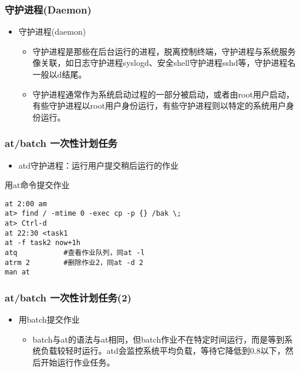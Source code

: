 \documentclass[xcolor=svgnames,presentation]{beamer}
\begin{document}
\begin{frame}
\frametitle{守护进程(Daemon)}
\label{sec-3-1-8}
\begin{itemize}

\item 守护进程(daemon)
\label{sec-3-1-8-1}%
\begin{itemize}

\item 守护进程是那些在后台运行的进程，脱离控制终端，守护进程与系统服务像关联，如日志守护进程syslogd、安全shell守护进程sshd等，守护进程名一般以d结尾。
\label{sec-3-1-8-1-1}%

\item 守护进程通常作为系统启动过程的一部分被启动，或者由root用户启动，有些守护进程以root用户身份运行，有些守护进程则以特定的系统用户身份运行。
\label{sec-3-1-8-1-2}%
\end{itemize} %
\end{itemize} %
\end{frame}
\begin{frame}[fragile]
\frametitle{at/batch 一次性计划任务}
\label{sec-3-1-9}
\begin{itemize}

\item atd守护进程：运行用户提交稍后运行的作业
\label{sec-3-1-9-1}%
\end{itemize} %
\begin{exampleblock}{用at命令提交作业}
\label{sec-3-1-9-2}


\begin{verbatim}
at 2:00 am
at> find / -mtime 0 -exec cp -p {} /bak \;
at> Ctrl-d
at 22:30 <task1
at -f task2 now+1h
atq           #查看作业队列，同at -l
atrm 2        #删除作业2，同at -d 2
man at
\end{verbatim}
\end{exampleblock}
\end{frame}
\begin{frame}
\frametitle{at/batch 一次性计划任务(2)}
\label{sec-3-1-10}
\begin{itemize}

\item 用batch提交作业
\label{sec-3-1-10-1}%
\begin{itemize}

\item batch与at的语法与at相同，但batch作业不在特定时间运行，而是等到系统负载较轻时运行。atd会监控系统平均负载，等待它降低到0.8以下，然后开始运行作业任务。
\label{sec-3-1-10-1-1}%
\end{itemize} %
\end{itemize} %
\end{frame}
\end{document}
